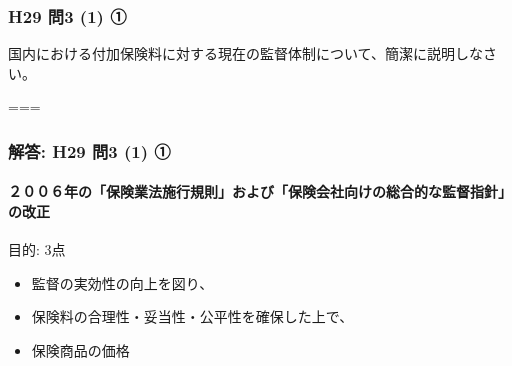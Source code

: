 \documentclass[]{article}
\begin{document}
\hypertarget{h29-ux554f3-1-ux2460}{%
\subsubsection{H29 問3 (1) ①}\label{h29-ux554f3-1-ux2460}}

国内における付加保険料に対する現在の監督体制について、簡潔に説明しなさい。

===

\hypertarget{ux89e3ux7b54-h29-ux554f3-1-ux2460}{%
\subsubsection{解答: H29 問3 (1)
①}\label{ux89e3ux7b54-h29-ux554f3-1-ux2460}}

\hypertarget{ux5e74ux306eux4fddux967aux696dux6cd5ux65bdux884cux898fux5247ux304aux3088ux3073ux4fddux967aux4f1aux793eux5411ux3051ux306eux7dcfux5408ux7684ux306aux76e3ux7763ux6307ux91ddux306eux6539ux6b63}{%
\paragraph{２００６年の「保険業法施行規則」および「保険会社向けの総合的な監督指針」の改正}\label{ux5e74ux306eux4fddux967aux696dux6cd5ux65bdux884cux898fux5247ux304aux3088ux3073ux4fddux967aux4f1aux793eux5411ux3051ux306eux7dcfux5408ux7684ux306aux76e3ux7763ux6307ux91ddux306eux6539ux6b63}}

目的: 3点

\begin{itemize}
\tightlist
\item
  監督の実効性の向上を図り、
\item
  保険料の合理性・妥当性・公平性を確保した上で、
\item
  保険商品の価格
\end{itemize}
\end{document}
